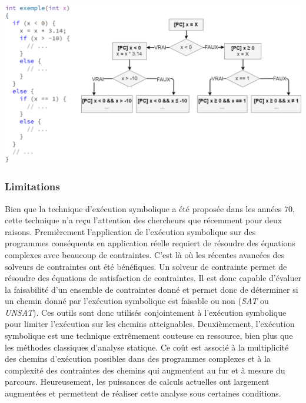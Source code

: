 \begin{center}
    \includegraphics[scale=0.4]{../ressources/images/dynamic_execution_example.png}
    \label{symbolic-execution-example1}
\end{center}


\subsubsection*{Limitations}
Bien que la technique d'exécution symbolique a été proposée dans les années 70\cite{symbolic-execution-by-king}, cette technique n'a reçu l'attention des chercheurs que récemment pour deux raisons. 
Premièrement l'application de l'exécution symbolique sur des programmes conséquents en application réelle requiert de résoudre des équations complexes avec beaucoup de contraintes. C'est là où les récentes avancées des solveurs de contraintes ont été bénéfiques. Un solveur de contrainte permet de résoudre des équations de satisfaction de contraintes. Il est donc capable d'évaluer la faisabilité d'un ensemble de contraintes donné et permet donc de déterminer si un chemin donné par l'exécution symbolique est faisable ou non (\textit{SAT} ou \textit{UNSAT}). Ces outils sont donc utilisés conjointement à l'exécution symbolique pour limiter l'exécution sur les chemins atteignables.
Deuxièmement, l'exécution symbolique est une technique extrêmement couteuse en ressource, bien plus que les méthodes classiques d'analyse statique. Ce coût est associé à la multiplicité des chemins d'exécution possibles dans des programmes complexes et à la complexité des contraintes des chemins qui augmentent au fur et à mesure du parcours. Heureusement, les puissances de calculs actuelles ont largement augmentées et permettent de réaliser cette analyse sous certaines conditions.

